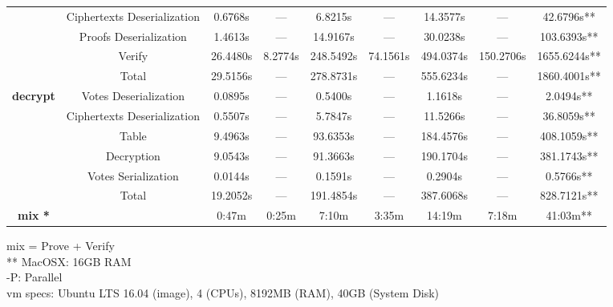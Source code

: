 \documentclass{standalone}
\begin{document}
\begin{threeparttable}
\begin{tabular}{c|c|ccccccc}
    & Ciphertexts Deserialization & 0.6768s & --- & 6.8215s & --- & 14.3577s & --- & 42.6796s** \\
    & Proofs Deserialization & 1.4613s & --- & 14.9167s & --- & 30.0238s & --- & 103.6393s** \\
    & Verify & 26.4480s & 8.2774s & 248.5492s & 74.1561s & 494.0374s & 150.2706s & 1655.6244s** \\
\hline
    & Total & 29.5156s & --- & 278.8731s & --- & 555.6234s & --- & 1860.4001s** \\
\hline
\hline
    \multirow{5}{*}{\textbf{decrypt}} & Votes Deserialization & 0.0895s & --- & 0.5400s & --- & 1.1618s & --- & 2.0494s** \\
    & Ciphertexts Deserialization & 0.5507s & --- & 5.7847s & --- & 11.5266s & --- & 36.8059s** \\
    & Table & 9.4963s & --- & 93.6353s & --- & 184.4576s & --- & 408.1059s** \\
    & Decryption & 9.0543s & --- & 91.3663s & --- & 190.1704s & --- & 381.1743s** \\
    & Votes Serialization & 0.0144s & --- & 0.1591s & --- & 0.2904s & --- & 0.5766s** \\
\hline
    & Total & 19.2052s & --- & 191.4854s & --- & 387.6068s & --- & 828.7121s** \\
\hline
\hline
    \textbf{mix *} & & 0:47m & 0:25m & 7:10m & 3:35m & 14:19m & 7:18m & 41:03m** \\
\hline
\hline
\end{tabular}
\begin{tablenotes}
\small
\item * mix = Prove + Verify \\
\@  ** MacOSX: 16GB RAM \\
\@  -P: Parallel \\
vm specs: Ubuntu LTS 16.04 (image), 4 (CPUs), 8192MB (RAM), 40GB (System Disk)
\end{tablenotes}
\end{threeparttable}
\end{document}
